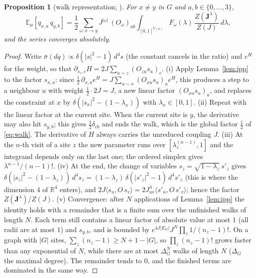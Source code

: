 \documentclass[11pt,a4paper]{article}
\theoremstyle{plain}
\newtheorem{proposition}[theorem]{Proposition}
\theoremstyle{remark}
\numberwithin{equation}{section}
\newcommand{\R}{\mathbb{R}}
\newcommand{\E}{\mathbb{E}}
\newcommand{\bs}{\boldsymbol}
\begin{document}
\begin{proposition}[walk representation; {\cite[(B.1)--(B.8), pp.~374--375]{BS83}}]\label{prop:walk}
For $x\ne y$ in $G$ and $a,b\in\{0,\dots,3\}$,
\begin{equation}\label{eq:walk}
\E_\mu[q_{x,a}\,q_{y,b}]=\frac12\sum_{\omega:x\to y}J^{|\omega|}\,(O_\omega)_{ab}\int_{[0,1]^{V(\omega)}}F_\omega(\lambda)\,
\frac{Z(\bs J^\lambda)}{Z(J)}\,d\lambda ,
\end{equation}
and the series converges absolutely.
\end{proposition}
\begin{proof}
Write $\bar\sigma(dq)\propto\delta(|s|^2-1)\,d^4s$ (the constant cancels in the ratio) and $e^{H}$ for the weight, so that
$\partial_{s_z,c}H=2J\sum_{u\sim z}(O_{zu}s_u)_c$.
(i) Apply Lemma~\ref{lem:ipp} to the factor $s_{x,a}$: since $\frac12\,\partial_{x,a}e^H=J\sum_{u\sim x}(O_{xu}s_u)_ae^H$, this
produces a step to a neighbour $u$ with weight $\frac12\cdot2J=J$, a new linear factor $(O_{xu}s_u)_a$, and replaces the constraint
at $x$ by $\delta(|s_x|^2-(1-\lambda_x))$ with $\lambda_x\in[0,1]$.
(ii) Repeat with the linear factor at the current site. When the current site is $y$, the derivative may also hit $s_{y,b}$; this
gives $\frac12\delta_{cb}$ and ends the walk, which is the global factor $\frac12$ of \eqref{eq:walk}. The derivative of $H$ always
carries the unreduced coupling $J$.
(iii) At the $n$-th visit of a site $z$ the new parameter runs over $[\lambda_z^{(n-1)},1]$ and the integrand depends only on the last
one; the ordered simplex gives $\lambda^{n-1}/(n-1)!$.
(iv) At the end, the change of variables $s_z=\sqrt{1-\lambda_z}\,s'_z$ gives $\delta(|s_z|^2-(1-\lambda_z))\,d^4s_z=(1-\lambda_z)\,
\delta(|s'_z|^2-1)\,d^4s'_z$ (this is where the dimension $4$ of $\R^4$ enters), and $2J\langle s_u,O\,s_v\rangle=2J^\lambda_{uv}
\langle s'_u,O\,s'_v\rangle$; hence the factor $Z(\bs J^\lambda)/Z(J)$.
(v) Convergence: after $N$ applications of Lemma~\ref{lem:ipp} the identity holds with a remainder that is a finite sum over the
unfinished walks of length $N$. Each term still contains a linear factor of absolute value at most $1$ (all radii are at most $1$)
and $s_{y,b}$, and is bounded by $e^{4J|E_G|}J^N\prod_z1/(n_z-1)!$. On a graph with $|G|$ sites,
$\sum_z(n_z-1)\ge N+1-|G|$, so $\prod_z(n_z-1)!$ grows faster than any exponential of $N$, while there are at most $\Delta_G^N$ walks of
length $N$ ($\Delta_G$ the maximal degree). The remainder tends to $0$, and the finished terms are dominated in the same way.
\end{proof}
\end{document}
